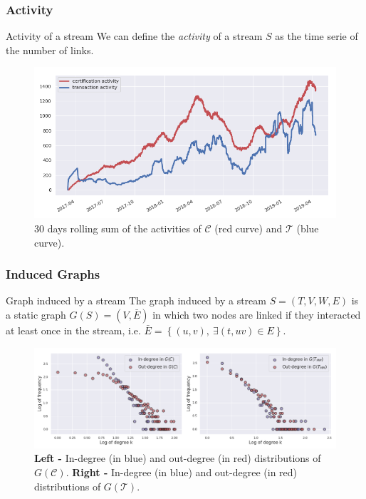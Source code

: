 \documentclass{beamer}
\begin{document}

\begin{frame}
	\frametitle{Activity}
	\begin{block}{Activity of a stream}
We can define the \textit{activity} of a stream $S$ as the time serie of the number of links.
	\end{block}
	\bigskip
	\begin{figure}
		\includegraphics[width=.8\linewidth]{./figures/activity}
		\caption{30 days rolling sum of the activities of $ \mathcal{C}$ (red curve) and $\mathcal{T}$ (blue curve).}
	\end{figure}
\end{frame}


\begin{frame}
	\frametitle{Induced Graphs}
	\begin{block}{Graph induced by a stream}
	The graph induced by a stream $S = \left(T, V, W, E \right)$ is a static graph $ G \left(S \right) = \left(V, \bar{E} \right)$ in which two nodes are linked if they interacted at least once in the stream, i.e. $ \bar{E} = \left\{ \left( u, v \right),\ \exists \left(t, uv \right) \in E \right\}$.
	\end{block}
	\bigskip
	\begin{figure}
		\includegraphics[width=.9\linewidth]{./figures/degree_distribution}
		\caption{\textbf{Left -} In-degree (in blue) and out-degree (in red) distributions of $G \left( \mathcal{C} \right)$. \textbf{Right -} In-degree (in blue) and out-degree (in red) distributions of $G \left( \mathcal{T} \right)$.}
	\end{figure}
\end{frame}
\end{document}
